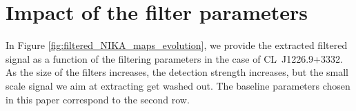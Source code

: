 \documentclass[twocolumn,traditabstract]{aa}
\begin{document}


\appendix
\section{Impact of the filter parameters}\label{sec:Impact_of_the_filter_parameters}
In Figure \ref{fig:filtered_NIKA_maps_evolution}, we provide the extracted filtered signal as a function of the filtering parameters in the case of \mbox{CL~J1226.9+3332}. As the size of the filters increases, the detection strength increases, but the small scale signal we aim at extracting get washed out. The baseline parameters chosen in this paper correspond to the second row.
\end{document}
